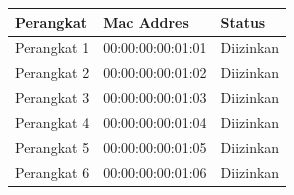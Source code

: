 \documentclass[a4paper, 12pt]{article}
\begin{document}
\begin{table}[H]
\centering
\begin{tabular}{|l|l|l|}
\hline
Perangkat   & Mac Addres        & Status    \\ \hline
Perangkat 1 & 00:00:00:00:01:01 & Diizinkan \\ \hline
Perangkat 2 & 00:00:00:00:01:02 & Diizinkan \\ \hline
Perangkat 3 & 00:00:00:00:01:03 & Diizinkan \\ \hline
Perangkat 4 & 00:00:00:00:01:04 & Diizinkan \\ \hline
Perangkat 5 & 00:00:00:00:01:05 & Diizinkan \\ \hline
Perangkat 6 & 00:00:00:00:01:06 & Diizinkan \\ \hline
\end{tabular}
\end{table}
\end{document}
